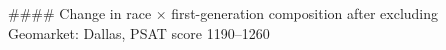 #### Change in race × first-generation composition after excluding Geomarket: Dallas, PSAT score 1190–1260
